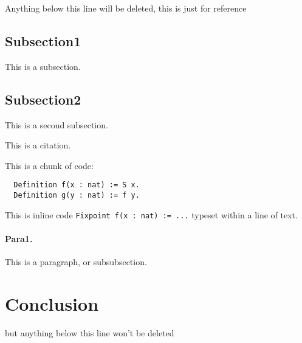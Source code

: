 \documentclass{llncs}
\begin{document}
 Anything below this line will be deleted, this is just for reference

\subsection{Subsection1} This is a subsection.

\subsection{Subsection2} This is a second subsection.




This is a citation.~\cite{gennaro2010non}

This is a chunk of code:
\begin{lstlisting}
  Definition f(x : nat) := S x.
  Definition g(y : nat) := f y.
\end{lstlisting}

This is inline code \lstinline|Fixpoint f(x : nat) := ...| typeset within a line of text.

\paragraph{Para1.} This is a paragraph, or subsubsection.

\section{Conclusion}

but anything below this line won't be deleted




\end{document}
